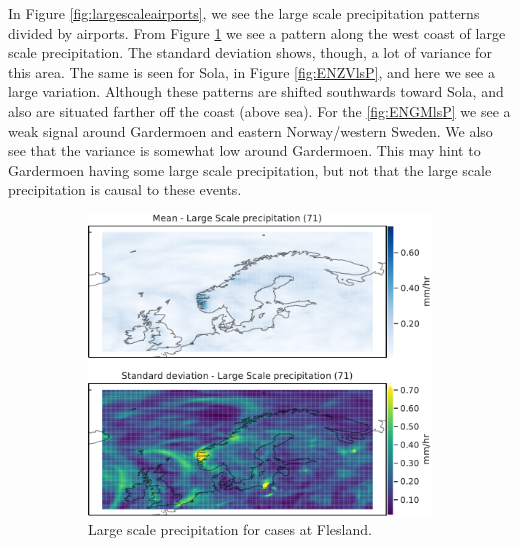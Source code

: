 In Figure \ref{fig:largescaleairports}, we see the large scale precipitation patterns divided by airports. From Figure \ref{fig:ENBRlsP} we see a pattern along the west coast of large scale precipitation. The standard deviation shows, though, a lot of variance for this area. The same is seen for Sola, in Figure \ref{fig:ENZVlsP}, and here we see a large variation. Although these patterns are shifted southwards toward Sola, and also are situated farther off the coast (above sea). For the \ref{fig:ENGMlsP} we see a weak signal around Gardermoen and eastern Norway/western Sweden. We also see that the variance is somewhat low around Gardermoen. This may hint to Gardermoen having some large scale precipitation, but not that the large scale precipitation is causal to these events. 

\begin{figure}
     \centering
     \begin{subfigure}[b]{0.49\textwidth}
         \centering
         \includegraphics[width=\textwidth]{Figures/lsPENBR.pdf}
         \caption{Large scale precipitation for cases at  Flesland.}
         \label{fig:ENBRlsP}
     \end{subfigure}
     \hfill
     \begin{subfigure}[b]{0.49\textwidth}
         \centering

\end{subfigure}
\end{figure}
